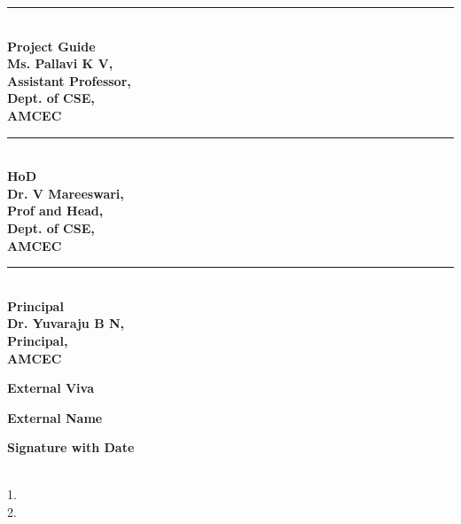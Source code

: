 \documentclass[a4paper, 12pt]{report}
\begin{document}
\vspace{1.5cm}
\noindent
\begin{minipage}[t]{0.32\textwidth}
    \singlespacing
    \centering
    \rule{0.8\linewidth}{0.4pt}\\
    \textbf{Project Guide\\Ms. Pallavi K V,\\Assistant Professor,\\Dept. of CSE,\\AMCEC}
\end{minipage}
\hfill
\begin{minipage}[t]{0.32\textwidth}
    \singlespacing
    \centering
    \rule{0.8\linewidth}{0.4pt}\\
    \textbf{HoD\\Dr. V Mareeswari,\\Prof and Head,\\Dept. of CSE,\\AMCEC}
\end{minipage}
\hfill
\begin{minipage}[t]{0.32\textwidth}
    \singlespacing
    \centering
    \rule{0.8\linewidth}{0.4pt}\\
    \textbf{Principal\\Dr. Yuvaraju B N,\\Principal,\\AMCEC}
\end{minipage}

\vspace{1.0cm}
\doublespacing
\begin{center}
    {\textbf{External Viva}}
\end{center}
\begin{minipage}[t]{0.32\textwidth}
    \centering  
    \textbf{External Name}
\end{minipage}
\hfill
\begin{minipage}[t]{0.32\textwidth}
    \centering
    \textbf{Signature with Date}
\end{minipage}\\
1.\\
2.

\titlespacing*{\chapter}{0pt}{20pt}{10pt}
\setlength{\parindent}{0pt}
\doublespacing

\end{document}
